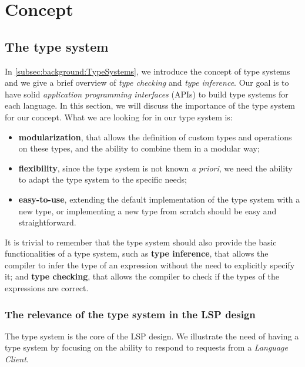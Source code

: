 \chapter{Concept}\label{chap:Concept}

\section{The type system}\label{sec:concept:TypeSystem}

In \ref{subsec:background:TypeSystems}, we introduce the concept of type systems and we give a brief overview of \textit{type checking} and \textit{type inference}. Our goal is to have solid \textit{application programming interfaces} (APIs) to build type systems for each language.
In this section, we will discuss the importance of the type system for our concept.
What we are looking for in our type system is:
\begin{itemize}
    \item \textbf{modularization}, that allows the definition of custom types and operations on these types, and the ability to combine them in a modular way;
    \item \textbf{flexibility}, since the type system is not known \textit{a priori}, we need the ability to adapt the type system to the specific needs;
    \item \textbf{easy-to-use}, extending the default implementation of the type system with a new type, or implementing a new type from scratch should be easy and straightforward.
\end{itemize}

It is trivial to remember that the type system should also provide the basic functionalities of a type system, such as \textbf{type inference}, that allows the compiler to infer the type of an expression without the need to explicitly specify it; and \textbf{type checking}, that allows the compiler to check if the types of the expressions are correct.

\subsection{The relevance of the type system in the LSP design}\label{subsec:concept:RelevanceOfTheTypeSystem}

The type system is the core of the LSP design. We illustrate the need of having a type system by focusing on the ability to respond to requests from a \textit{Language Client}.

